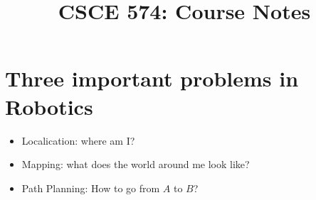 \documentclass[11pt, oneside]{article}
\title{CSCE 574: Course Notes}
\begin{document}
\maketitle

\section{Three important problems in Robotics}
\begin{itemize}
\item Localication: where am I?
\item Mapping: what does the world around me look like?
  \item Path Planning: How to go from $A$ to $B$?
\end{itemize}
\end{document}
